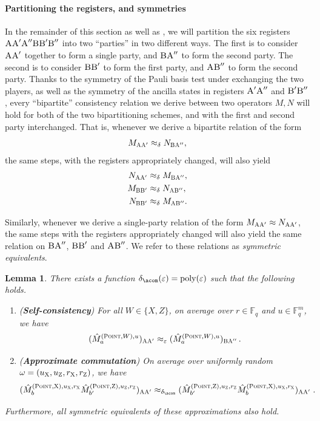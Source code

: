 \documentclass[11pt]{article}
\newtheorem{lemma}[theorem]{Lemma}
\theoremstyle{definition}
\newcommand{\F}{\ensuremath{\mathbb{F}}}
\DeclareMathOperator{\poly}{poly}
\newcommand{\eps}{\varepsilon}
\newcommand{\labelstyle}[1]{\ensuremath{\textsc{#1}}\xspace}
\newcommand{\xpt}{\labelstyle{X}}
\newcommand{\zpt}{\labelstyle{Z}}
\newcommand{\alice}{\labelstyle{A}}
\newcommand{\bob}{\labelstyle{B}}
\newcommand{\typestyle}[1]{\ensuremath{\textsc{#1}}\xspace}
\newcommand{\Point}{\typestyle{Point}}
\begin{document}
\paragraph{Partitioning the registers, and symmetries}
In the remainder of this section as well as , we will partition the six registers
$\alice \alice' \alice'' \bob \bob' \bob''$ into
two ``parties'' in two different ways. The first is to consider
$\alice \alice'$ together to form  a single party, and $\bob \alice''$
to form the second party. The second is to consider $\bob \bob'$ to
form the first party, and $\alice \bob''$ to form the second
party. Thanks to the symmetry of the Pauli basis test under exchanging the
two players, as well as the symmetry of the ancilla states in
registers $\alice' \alice''$ and $\bob' \bob''$, every ``bipartite'' consistency relation we derive between two
operators $M, N$ will hold for both of the two bipartitioning schemes,
and with the first and second party interchanged. That is, whenever we
derive a bipartite relation of the form
\[ M_{\alice \alice'} \approx_\delta N_{\bob \alice''}, \]
the same steps, with the registers appropriately changed, will also
yield
\begin{align*}
  N_{\alice \alice'} &\approx_{\delta} M_{\bob \alice''}, \\
  M_{\bob \bob'} &\approx_{\delta} N_{\alice \bob''}, \\
  N_{\bob \bob'} &\approx_{\delta} M_{\alice \bob''}.
\end{align*}

Similarly, whenever we derive a single-party relation of the form
$M_{\alice \alice'} \approx N_{\alice \alice'}$, the same steps with
the registers appropriately changed will also yield the same relation
on $\bob\alice''$, $\bob \bob'$ and $\alice \bob''$. We refer to these
relations as \emph{symmetric equivalents}.

\begin{lemma}
\label{lem:qld-comm-cons}
	There exists a function $\delta_{\acom}(\eps) = \poly(\eps)$ such that the following holds. 


\begin{enumerate}
	\item (\textbf{Self-consistency}) For all $W \in \{X,Z\}$, on average over $r \in \F_q$ and $u\in \F_q^m$, we have 
	\[
		(\hat{M}^{(\Point,W),u}_a)_{\alice \alice'} \approx_\eps (\hat{M}^{(\Point,W),u}_a)_{\bob \alice''}\,.
		\]
	\item (\textbf{Approximate commutation}) On average over
          uniformly random $\omega = (u_\xpt,u_\zpt,r_\xpt,r_\zpt)$,
          we have 
	\[
		(\hat{M}^{(\Point,\xpt),u_\xpt,r_\xpt}_{b}
                \hat{M}^{(\Point,\zpt),u_\zpt,r_\zpt}_{b'})_{\alice
                  \alice'} \approx_{\delta_{\acom}}
                (\hat{M}^{(\Point,\zpt),u_\zpt,r_\zpt}_{b'}
                \hat{M}^{(\Point,\xpt),u_\xpt,r_\xpt}_{b})_{\alice
                  \alice'} \;.
	\]
      \end{enumerate}
      Furthermore, all symmetric equivalents of these approximations
      also hold.
\end{lemma}
\end{document}
